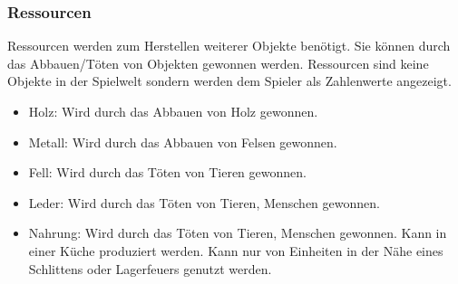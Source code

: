\documentclass[a4paper,
  twoside, %
  headlines=2.1 %
  ]{scrartcl}
\begin{document}
			\subsubsection{Ressourcen}
			    Ressourcen werden zum Herstellen weiterer Objekte benötigt. Sie können durch das Abbauen/Töten von Objekten gewonnen werden. Ressourcen sind keine Objekte in der Spielwelt sondern werden dem Spieler als Zahlenwerte angezeigt.
                \begin{itemize}
                    \item Holz: Wird durch das Abbauen von Holz gewonnen.
                    \item Metall: Wird durch das Abbauen von Felsen gewonnen.
                    \item Fell: Wird durch das Töten von Tieren gewonnen.
                    \item Leder: Wird durch das Töten von Tieren, Menschen gewonnen.
                    \item Nahrung: Wird durch das Töten von Tieren, Menschen gewonnen. Kann in einer Küche produziert werden. Kann nur von Einheiten in der Nähe eines Schlittens oder Lagerfeuers genutzt werden.
                \end{itemize}
\end{document}
